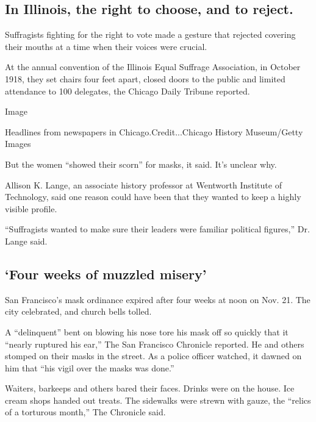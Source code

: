 \hypertarget{in-illinois-the-right-to-choose-and-to-reject}{%
\subsection{In Illinois, the right to choose, and to
reject.}\label{in-illinois-the-right-to-choose-and-to-reject}}

Suffragists fighting for the right to vote made a gesture that rejected
covering their mouths at a time when their voices were crucial.

At the annual convention of the Illinois Equal Suffrage Association, in
October 1918, they set chairs four feet apart, closed doors to the
public and limited attendance to 100 delegates, the Chicago Daily
Tribune reported.

Image

Headlines from newspapers in Chicago.Credit...Chicago History
Museum/Getty Images

But the women ``showed their scorn'' for masks, it said. It's unclear
why.

Allison K. Lange, an associate history professor at Wentworth Institute
of Technology, said one reason could have been that they wanted to keep
a highly visible profile.

``Suffragists wanted to make sure their leaders were familiar political
figures,'' Dr. Lange said.

\hypertarget{four-weeks-of-muzzled-misery}{%
\subsection{`Four weeks of muzzled
misery'}\label{four-weeks-of-muzzled-misery}}

San Francisco's mask ordinance expired after four weeks at noon on Nov.
21. The city celebrated, and church bells tolled.

A ``delinquent'' bent on blowing his nose tore his mask off so quickly
that it ``nearly ruptured his ear,'' The San Francisco Chronicle
reported. He and others stomped on their masks in the street. As a
police officer watched, it dawned on him that ``his vigil over the masks
was done.''

Waiters, barkeeps and others bared their faces. Drinks were on the
house. Ice cream shops handed out treats. The sidewalks were strewn with
gauze, the ``relics of a torturous month,'' The Chronicle said.

\href{https://www.nytimes3xbfgragh.onion/news-event/coronavirus?action=click\&pgtype=Article\&state=default\&region=MAIN_CONTENT_3\&context=storylines_faq}{}

